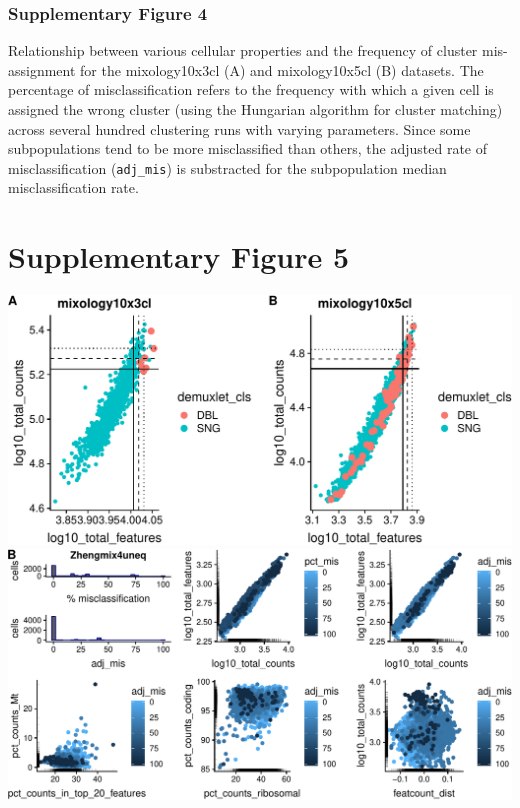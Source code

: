 \documentclass[]{article}
\begin{document}
\vfill

\hypertarget{supplementary-figure-4-1}{%
\subsubsection{Supplementary Figure 4}\label{supplementary-figure-4-1}}

Relationship between various cellular properties and the frequency of
cluster mis-assignment for the mixology10x3cl (A) and mixology10x5cl (B)
datasets. The percentage of misclassification refers to the frequency
with which a given cell is assigned the wrong cluster (using the
Hungarian algorithm for cluster matching) across several hundred
clustering runs with varying parameters. Since some subpopulations tend
to be more misclassified than others, the adjusted rate of
misclassification (\texttt{adj\_mis}) is substracted for the
subpopulation median misclassification rate.

\newpage

\hypertarget{supplementary-figure-5}{%
\section{Supplementary Figure 5}\label{supplementary-figure-5}}

\includegraphics{supp_figures_files/figure-latex/unnamed-chunk-5-1.pdf}
\vspace{1cm}
\includegraphics{supp_figures_files/figure-latex/unnamed-chunk-6-1.pdf}
\end{document}
